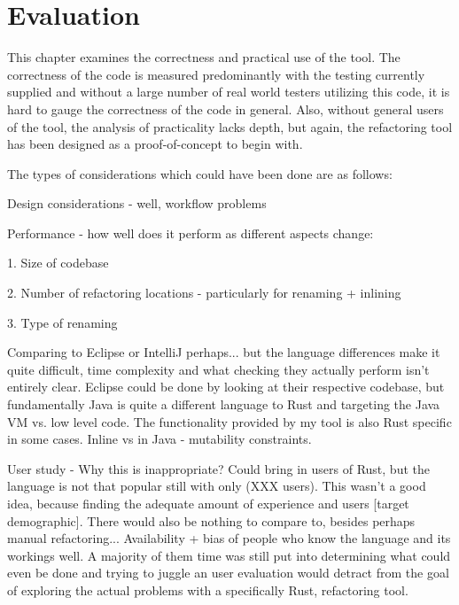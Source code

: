 \chapter{Evaluation}\label{C:eval}
This chapter examines the correctness and practical use of the tool. The correctness of the code is measured predominantly with the testing currently supplied and without a large number of real world testers utilizing this code, it is hard to gauge the correctness of the code in general. Also, without general users of the tool, the analysis of practicality lacks depth, but again, the refactoring tool has been designed as a proof-of-concept to begin with.

The types of considerations which could have been done are as follows:

Design considerations - well, workflow problems

Performance - how well does it perform as different aspects change:

1. Size of codebase

2. Number of refactoring locations - particularly for renaming + inlining

3. Type of renaming

Comparing to Eclipse or IntelliJ perhaps... but the language differences make it quite difficult, time complexity and what checking they actually perform isn't entirely clear. Eclipse could be done by looking at their respective codebase, but fundamentally Java is quite a different language to Rust and targeting the Java VM vs. low level code. The functionality provided by my tool is also Rust specific in some cases. Inline vs in Java - mutability constraints.

User study - Why this is inappropriate? Could bring in users of Rust, but the language is not that popular still with only (XXX users). This wasn't a good idea, because finding the adequate amount of experience and users [target demographic]. There would also be nothing to compare to, besides perhaps manual refactoring... Availability + bias of people who know the language and its workings well. A majority of them time was still put into determining what could even be done and trying to juggle an user evaluation would detract from the goal of exploring the actual problems with a specifically Rust, refactoring tool. 

